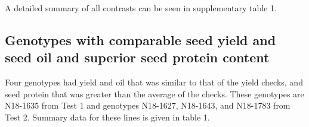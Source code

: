 \documentclass[Agronomy,article,submit,moreauthors,pdftex]{mdpi}
\begin{document}
A detailed summary of all contrasts can be seen in supplementary table
1.

\hypertarget{genotypes-with-comparable-seed-yield-and-seed-oil-and-superior-seed-protein-content}{%
\subsection{Genotypes with comparable seed yield and seed oil and
superior seed protein
content}\label{genotypes-with-comparable-seed-yield-and-seed-oil-and-superior-seed-protein-content}}

Four genotypes had yield and oil that was similar to that of the yield
checks, and seed protein that was greater than the average of the
checks. These genotypes are N18-1635 from Test 1 and genotypes N18-1627,
N18-1643, and N18-1783 from Test 2. Summary data for these lines is
given in table 1.
\end{document}

